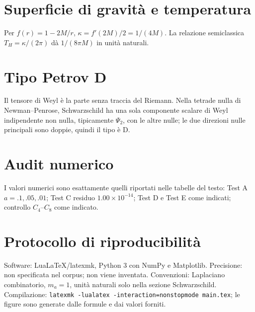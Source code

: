 \documentclass[11pt,a4paper]{article}
\begin{document}
\section{Superficie di gravità e temperatura}
Per $f(r)=1-2M/r$, $\kappa=f'(2M)/2=1/(4M)$. La relazione semiclassica $T_H=\kappa/(2\pi)$ dà $1/(8\pi M)$ in unità naturali.
\section{Tipo Petrov D}
Il tensore di Weyl è la parte senza traccia del Riemann. Nella tetrade nulla di Newman--Penrose, Schwarzschild ha una sola componente scalare di Weyl indipendente non nulla, tipicamente $\Psi_2$, con le altre nulle; le due direzioni nulle principali sono doppie, quindi il tipo è D.
\section{Audit numerico}
I valori numerici sono esattamente quelli riportati nelle tabelle del testo: Test A $a=.1,.05,.01$; Test C residuo $1.00\times10^{-14}$; Test D e Test E come indicati; controllo $C_4$--$C_8$ come indicato.
\section{Protocollo di riproducibilità}
Software: LuaLaTeX/latexmk, Python 3 con NumPy e Matplotlib. Precisione: non specificata nel corpus; non viene inventata. Convenzioni: Laplaciano combinatorio, $m_a=1$, unità naturali solo nella sezione Schwarzschild. Compilazione: \texttt{latexmk -lualatex -interaction=nonstopmode main.tex}; le figure sono generate dalle formule e dai valori forniti.

\end{document}

